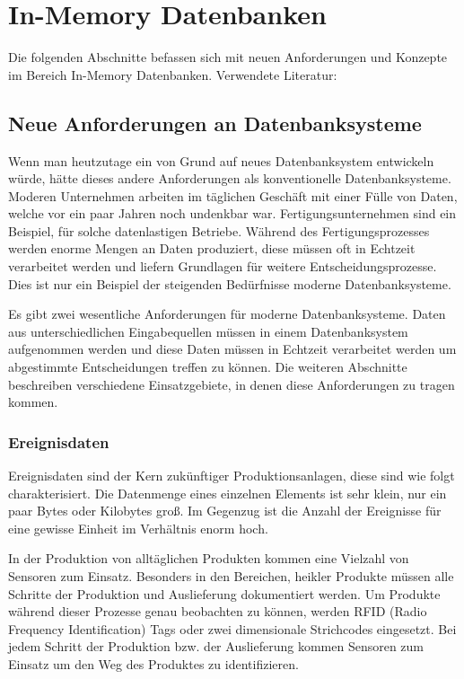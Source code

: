 \documentclass[draft,final]{vutinfth} %
\begin{document}
\chapter{In-Memory Datenbanken}
Die folgenden Abschnitte befassen sich mit neuen Anforderungen und Konzepte im Bereich In-Memory Datenbanken. Verwendete Literatur: \cite{BookInMem}
\section{Neue Anforderungen an Datenbanksysteme}
Wenn man heutzutage ein von Grund auf neues Datenbanksystem entwickeln würde, hätte dieses andere Anforderungen als konventionelle Datenbanksysteme. Moderen Unternehmen arbeiten im täglichen Geschäft mit einer Fülle von Daten, welche vor ein paar Jahren noch undenkbar war. Fertigungsunternehmen sind ein Beispiel, für solche datenlastigen Betriebe. Während des Fertigungsprozesses werden enorme Mengen an Daten produziert, diese müssen oft in Echtzeit verarbeitet werden und liefern Grundlagen für weitere Entscheidungsprozesse. Dies ist nur ein Beispiel der steigenden Bedürfnisse moderne Datenbanksysteme. 

Es gibt zwei wesentliche Anforderungen für moderne Datenbanksysteme. Daten aus unterschiedlichen Eingabequellen müssen in einem Datenbanksystem aufgenommen werden und diese Daten müssen in Echtzeit verarbeitet werden um abgestimmte Entscheidungen treffen zu können. Die weiteren Abschnitte beschreiben verschiedene Einsatzgebiete, in denen diese Anforderungen zu tragen kommen.

\subsection*{Ereignisdaten}
Ereignisdaten sind der Kern zukünftiger Produktionsanlagen, diese sind wie folgt charakterisiert. Die Datenmenge eines einzelnen Elements ist sehr klein, nur ein paar Bytes oder Kilobytes gro\ss . Im Gegenzug ist die Anzahl der Ereignisse für eine gewisse Einheit im Verhältnis enorm hoch. 

In der Produktion von alltäglichen Produkten kommen eine Vielzahl von Sensoren zum Einsatz. Besonders in den Bereichen, heikler Produkte müssen alle Schritte der Produktion und Auslieferung dokumentiert werden. Um Produkte während dieser Prozesse genau beobachten zu können, werden RFID (Radio Frequency Identification) Tags oder zwei dimensionale Strichcodes eingesetzt. Bei jedem Schritt der Produktion bzw. der Auslieferung kommen Sensoren zum Einsatz um den Weg des Produktes zu identifizieren. 
\end{document}
